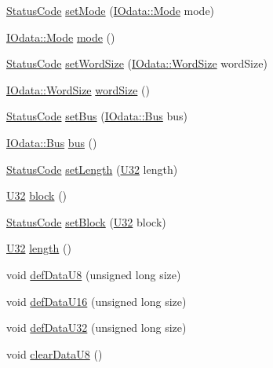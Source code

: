 \begin{DoxyCompactItemize}
\item 
\hyperlink{classStatusCode}{StatusCode} \hyperlink{classIOdata_ad81e9fd3f2cd9dcaffd9eabddf8f867e}{setMode} (\hyperlink{classIOdata_a044e9a4a0c6d25a43ebfe29c4fa4f1e5}{IOdata::Mode} mode)
\item 
\hyperlink{classIOdata_a044e9a4a0c6d25a43ebfe29c4fa4f1e5}{IOdata::Mode} \hyperlink{classIOdata_aae2073c3bc6bc9f620dc0fca7fccc9a7}{mode} ()
\item 
\hyperlink{classStatusCode}{StatusCode} \hyperlink{classIOdata_a20f30a9f4673713616447b1b5e9817d5}{setWordSize} (\hyperlink{classIOdata_a37c53ebf4bf8d866aac8af572962a84c}{IOdata::WordSize} wordSize)
\item 
\hyperlink{classIOdata_a37c53ebf4bf8d866aac8af572962a84c}{IOdata::WordSize} \hyperlink{classIOdata_a91f9e8b4095ca8365a824e43be36b143}{wordSize} ()
\item 
\hyperlink{classStatusCode}{StatusCode} \hyperlink{classIOdata_aca154b90e490608b5b5c0ead58e1fafc}{setBus} (\hyperlink{classIOdata_a99aa7bed39364c4359ab8a7596bc013c}{IOdata::Bus} bus)
\item 
\hyperlink{classIOdata_a99aa7bed39364c4359ab8a7596bc013c}{IOdata::Bus} \hyperlink{classIOdata_ab904bcca0e8e3bebc3299e47ca93a8a1}{bus} ()
\item 
\hyperlink{classStatusCode}{StatusCode} \hyperlink{classIOdata_affaf98e7f9e596263e914b055f8f93c2}{setLength} (\hyperlink{classIOdata_a96fb57f5fcd87b708743abd3c86a5198}{U32} length)
\item 
\hyperlink{classIOdata_a96fb57f5fcd87b708743abd3c86a5198}{U32} \hyperlink{classIOdata_aeda27840c9a9b7b3b86efc71c56cd868}{block} ()
\item 
\hyperlink{classStatusCode}{StatusCode} \hyperlink{classIOdata_a334f07d85e3dc8069551dcd8ab942e9c}{setBlock} (\hyperlink{classIOdata_a96fb57f5fcd87b708743abd3c86a5198}{U32} block)
\item 
\hyperlink{classIOdata_a96fb57f5fcd87b708743abd3c86a5198}{U32} \hyperlink{classIOdata_abb40e71ce0290832a24857b4a1e7b1a3}{length} ()
\item 
void \hyperlink{classIOdata_a80bb230b61062b447db5832e43bf7b44}{defDataU8} (unsigned long size)
\item 
void \hyperlink{classIOdata_a9e37c736d6dfb5223ed45786fad403da}{defDataU16} (unsigned long size)
\item 
void \hyperlink{classIOdata_a78e50aa4a6c967cba195e77fe911a8c3}{defDataU32} (unsigned long size)
\item 
void \hyperlink{classIOdata_a9bc3ea0458ea6d13bd751ac4c80a4be6}{clearDataU8} ()

\end{DoxyCompactItemize}
